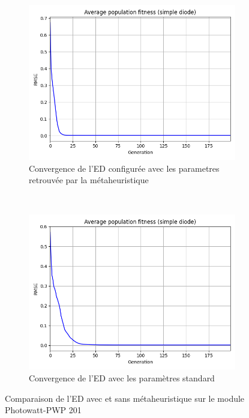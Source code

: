 \begin{figure}
    \centering
    \begin{subfigure}[b]{0.45\textwidth}
        \includegraphics[width=\textwidth]{resources/pwp/metafit.png}
        \caption{Convergence de l'ED configurée avec les parametres retrouvée par la métaheuristique}
    \end{subfigure}
    ~
    \begin{subfigure}[b]{0.45\textwidth}
        \includegraphics[width=\textwidth]{resources/pwp/fitness.png}
        \caption{Convergence de l'ED avec les paramètres standard}
    \end{subfigure}
    \caption{Comparaison de l'ED avec et sans métaheuristique sur le module Photowatt-PWP 201}
    \label{fig:metaconv}
\end{figure}%

